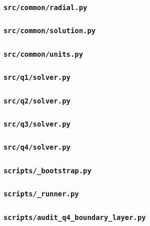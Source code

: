 \subsubsection*{\texttt{src/common/radial.py}}

\subsubsection*{\texttt{src/common/solution.py}}

\subsubsection*{\texttt{src/common/units.py}}

\subsubsection*{\texttt{src/q1/solver.py}}

\subsubsection*{\texttt{src/q2/solver.py}}

\subsubsection*{\texttt{src/q3/solver.py}}

\subsubsection*{\texttt{src/q4/solver.py}}

\subsubsection*{\texttt{scripts/\_bootstrap.py}}

\subsubsection*{\texttt{scripts/\_runner.py}}

\subsubsection*{\texttt{scripts/audit\_q4\_boundary\_layer.py}}

